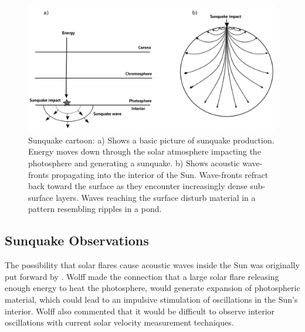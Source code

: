\begin{figure}[hb]%
  \begin{center}
  \includegraphics[width=0.99\textwidth]{sunquake-cartoon}
  \caption{Sunquake cartoon: a) Shows a basic picture of sunquake production. Energy moves down through the solar atmosphere impacting the photosphere and generating a sunquake. b) Shows acoustic wave-fronts propagating into the interior of the Sun. Wave-fronts refract back toward the surface as they encounter increasingly dense sub-surface layers. Waves reaching the surface disturb material in a pattern resembling ripples in a pond.}\label{sunquake-cartoon}
\end{center}
\end{figure}

\subsection{Sunquake Observations}
The possibility that solar flares cause acoustic waves inside the Sun was originally put forward by \citep{1972ApJ...176..833W}. Wolff made the connection that a large solar flare releasing enough energy to heat the photosphere, would generate expansion of photospheric material, which could lead to an impulsive stimulation of oscillations in the Sun's interior. Wolff also commented that it would be difficult to observe interior oscillations with current solar velocity measurement techniques.      

